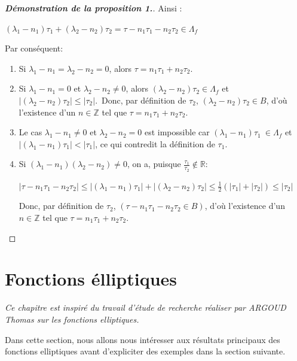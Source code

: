\documentclass[12pt]{article}
\begin{document}
\begin{proof}[\textbf{Démonstration de la proposition 1.}]
    Ainsi :

    \((\lambda_1 - n_1)\tau_1 + (\lambda_2 - n_2)\tau_2 = \tau - n_1\tau_1 - n_2\tau_2 \in \Lambda_f\)


    Par conséquent:
    \begin{enumerate}
    \item Si \(\lambda_1 - n_1 = \lambda_2 - n_2 = 0\), alors \(\tau = n_1\tau_1 + n_2\tau_2\).
    \item Si \(\lambda_1 - n_1 = 0\) et \(\lambda_2 - n_2 \neq 0\), alors \((\lambda_2 - n_2)\tau_2 \in \Lambda_f\) et \(\left|(\lambda_2 - n_2)\tau_2\right| \leq |\tau_2|\).\
    Donc, par définition de \(\tau_2\), \((\lambda_2 - n_2)\tau_2 \in B\), d’où l’existence d’un \(n \in \mathbb{Z}\) tel que \(\tau = n_1\tau_1 + n_2\tau_2\).
    \item Le cas \(\lambda_1 - n_1 \neq 0\) et \(\lambda_2 - n_2 = 0\) est impossible car \((\lambda_1 - n_1)\tau_1\ \in \Lambda_f\) et \(\left|(\lambda_1 - n_1)\tau_1\right| < |\tau_1|\), ce qui contredit la définition de \(\tau_1\).
    \item Si \((\lambda_1 - n_1)(\lambda_2 - n_2) \neq 0\), on a, puisque \(\frac{\tau_1}{\tau_2} \notin \mathbb{R}\):

    \(\left|\tau - n_1\tau_1 - n_2\tau_2\right| \leq \left|(\lambda_1 - n_1)\tau_1\right| + \left|(\lambda_2 - n_2)\tau_2\right| \leq \frac{1}{2}\left(|\tau_1| + |\tau_2|\right) \leq |\tau_2|\)

    Donc, par définition de \(\tau_2\), \((\tau -n_1\tau_1 - n_2\tau_2 \in B)\), d’où l’existence d’un \(n \in \mathbb{Z}\) tel que \(\tau = n_1\tau_1 + n_2\tau_2\).
    \end{enumerate}

\end{proof}



    \section{Fonctions élliptiques}
    \textit{Ce  chapitre est inspiré du travail d'étude de recherche réaliser par ARGOUD Thomas  sur les fonctions elliptiques.}

    Dans cette section, nous allons nous intéresser aux résultats principaux des fonctions elliptiques avant d’expliciter des exemples dans la section suivante.
\end{document}
